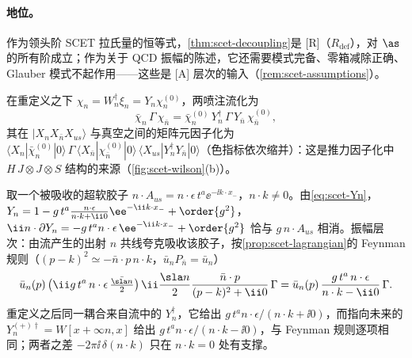 \paragraph{地位。}作为领头阶 SCET 拉氏量的恒等式，\cref{thm:scet-decoupling}是 [R]（$R_{\mathrm{def}}$），对 $\as$ 的所有阶成立；作为关于 QCD 振幅的陈述，它还需要模式完备、零箱减除正确、Glauber 模式不起作用——这些是 [A] 层次的输入（\cref{rem:scet-assumptions}）。

在重定义之下 $\chi_n=W_n^\dagger\xi_n=Y_n\chi^{(0)}_n$，两喷注流化为
\begin{equation}\label{eq:scet-JY}
\bar\chi_n\,\Gamma\,\chi_{\bar n}=\bar\chi^{(0)}_n\,Y_n^\dagger\,\Gamma\,Y_{\bar n}\,\chi^{(0)}_{\bar n},
\end{equation}
其在 $|X_nX_{\bar n}X_{us}\rangle$ 与真空之间的矩阵元因子化为 $\langle X_n|\bar\chi^{(0)}_n|0\rangle\,\Gamma\,\langle X_{\bar n}|\chi^{(0)}_{\bar n}|0\rangle\,\langle X_{us}|Y_n^\dagger Y_{\bar n}|0\rangle$（色指标依次缩并）：这是推力因子化中 $H\,J\otimes J\otimes S$ 结构的来源（\cref{fig:scet-wilson}(b)）。

\begin{example}\label{ex:scet-decoupling-tree}
取一个被吸收的超软胶子 $n\cdot A_{us}=n\cdot\epsilon\,t^a\ee^{-\ii k\cdot x_-}$，$n\cdot k\neq0$。由\cref{eq:scet-Yn}，$Y_n=1-g\,t^a\frac{n\cdot\epsilon}{n\cdot k+\ii0}\ee^{-\ii k\cdot x_-}+\order{g^2}$，$\ii n\cdot\partial Y_n=-g\,t^an\cdot\epsilon\,\ee^{-\ii k\cdot x_-}+\order{g^2}$ 恰与 $g\,n\cdot A_{us}$ 相消。振幅层次：由流产生的出射 $n$ 共线夸克吸收该胶子，按\cref{prop:scet-lagrangian}的 Feynman 规则（$(p-k)^2\simeq-\bar n\cdot p\,n\cdot k$，$\bar u_nP_{\bar n}=\bar u_n$）
\[
\bar u_n(p)\,\big(\ii g\,t^a\,n\cdot\epsilon\,\tfrac{\bar{\sla n}}{2}\big)\,\ii\frac{\sla n}{2}\frac{\bar n\cdot p}{(p-k)^2+\ii0}\,\Gamma=\bar u_n(p)\,\frac{g\,t^a\,n\cdot\epsilon}{n\cdot k-\ii0}\,\Gamma .
\]
重定义之后同一耦合来自流中的 $Y_n^\dagger$，它给出 $g\,t^a n\cdot\epsilon/(n\cdot k+\ii0)$，而指向未来的 $Y_n^{(+)\dagger}=W[x+\infty n,x]$ 给出 $g\,t^an\cdot\epsilon/(n\cdot k-\ii0)$，与 Feynman 规则逐项相同；两者之差 $-2\pi\ii\,\delta(n\cdot k)$ 只在 $n\cdot k=0$ 处有支撑。%
\end{example}

